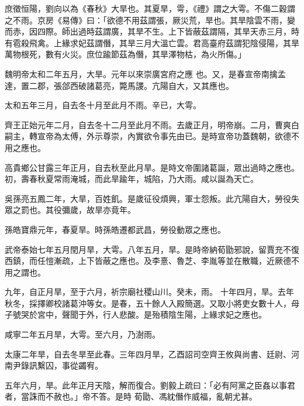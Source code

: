 \begin{pinyinscope}
 庶徵恒陽，劉向以為《春秋》大旱也。其夏旱，雩，《禮》謂之大雩。不傷二穀謂之不雨。京房《易傳》曰：「欲德不用茲謂張，厥災荒，旱也。其旱陰雲不雨，變而赤，因四際。師出過時茲謂廣，其旱不生。上下皆蔽茲謂隔，其旱天赤三月，時有雹殺飛禽。上緣求妃茲謂僭，其旱三月大溫亡雲。君高臺府茲謂犯陰侵陽，其旱萬物根死，數有火災。庶位踰節茲為僭，其旱澤物枯，為火所傷。」



 魏明帝太和二年五月，大旱。元年以來崇廣宮府之應
 也。又，是春宣帝南擒孟達，置二郡，張郃西破諸葛亮，斃馬謖。亢陽自大，又其應也。



 太和五年三月，自去冬十月至此月不雨。辛已，大雩。



 齊王正始元年二月，自去冬十二月至此月不雨。去歲正月，明帝崩。二月，曹爽白嗣主，轉宣帝為太傅，外示尊崇，內實欲令事先由已。是時宣帝功蓋魏朝，欲德不用之應也。



 高貴鄉公甘露三年正月，自去秋至此月旱。是時文帝圍諸葛誕，眾出過時之應也。初，壽春秋夏常雨淹城，而此旱踰年，城陷，乃大雨。咸以誕為天亡。



 吳孫亮五鳳二年，大旱，百姓飢。是歲征役煩興，軍士怨叛。此亢陽自大，勞役失眾之罰也。其役彌歲，故旱亦竟年。



 孫皓寶鼎元年，春夏旱。時孫皓遷都武昌，勞役動眾之應也。



 武帝泰始七年五月閏月旱，大雩。八年五月，旱。是時帝納荀勖邪說，留賈充不復西鎮，而任愷漸疏，上下皆蔽之應也。及李憙、魯芝、李胤等並在散職，近厥德不用之謂也。



 九年，自正月旱，至于六月，祈宗廟社稷山川。癸未，雨。
 十年四月，旱。去年秋冬，採擇卿校諸葛沖等女。是春，五十餘人入殿簡選。又取小將吏女數十人，母子號哭於宮中，聲聞于外，行人悲酸。是殆積陰生陽，上緣求妃之應也。



 咸寧二年五月旱，大雩。至六月，乃澍雨。



 太康二年旱，自去冬旱至此春。三年四月旱，乙酉詔司空齊王攸與尚書、廷尉、河南尹錄訊繫囚，事從蠲宥。



 五年六月，旱。此年正月天陰，解而復合。劉毅上疏曰：「必有阿黨之臣姦以事君者，當誅而不赦也。」帝不答。是時
 荀勖、馮紞僭作威福，亂朝尤甚。




\end{pinyinscope}
